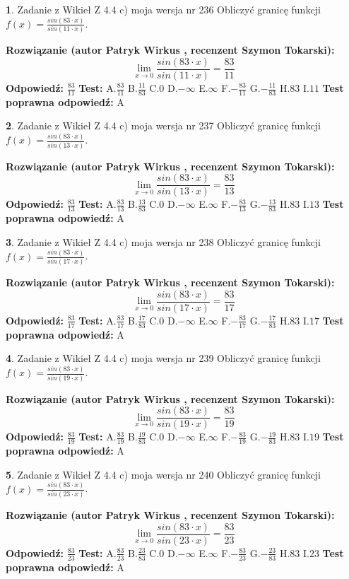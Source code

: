 \documentclass[12pt, a4paper]{article}
\theoremstyle{definition} %
\newtheorem{zad}{}
\newcommand{\zadStart}[1]{\begin{zad}#1\newline}
\newcommand{\zadStop}{\end{zad}}
\newcommand{\rozwStart}[2]{\noindent \textbf{Rozwiązanie (autor #1 , recenzent #2): }\newline}
\newcommand{\rozwStop}{\newline}
\newcommand{\odpStart}{\noindent \textbf{Odpowiedź:}\newline}
\newcommand{\odpStop}{\newline}
\newcommand{\testStart}{\noindent \textbf{Test:}\newline}
\newcommand{\testStop}{\newline}
\newcommand{\kluczStart}{\noindent \textbf{Test poprawna odpowiedź:}\newline}
\newcommand{\kluczStop}{\newline}
\begin{document}
\zadStart{Zadanie z Wikieł Z 4.4 c) moja wersja nr 236}
Obliczyć granicę funkcji $f(x)=\frac{sin(83\cdot x)}{sin(11\cdot x)}$.
\zadStop
\rozwStart{Patryk Wirkus}{Szymon Tokarski}
$$\lim\limits_{x\to 0}\frac{sin(83\cdot x)}{sin(11\cdot x)}=
\frac{83}{11}$$
\rozwStop
\odpStart
$\frac{83}{11}$
\odpStop
\testStart
A.$\frac{83}{11}$
B.$\frac{11}{83}$
C.$0$
D.$-\infty$
E.$\infty$
F.$-\frac{83}{11}$
G.$-\frac{11}{83}$
H.$83$
I.$11$
\testStop
\kluczStart
A
\kluczStop



\zadStart{Zadanie z Wikieł Z 4.4 c) moja wersja nr 237}
Obliczyć granicę funkcji $f(x)=\frac{sin(83\cdot x)}{sin(13\cdot x)}$.
\zadStop
\rozwStart{Patryk Wirkus}{Szymon Tokarski}
$$\lim\limits_{x\to 0}\frac{sin(83\cdot x)}{sin(13\cdot x)}=
\frac{83}{13}$$
\rozwStop
\odpStart
$\frac{83}{13}$
\odpStop
\testStart
A.$\frac{83}{13}$
B.$\frac{13}{83}$
C.$0$
D.$-\infty$
E.$\infty$
F.$-\frac{83}{13}$
G.$-\frac{13}{83}$
H.$83$
I.$13$
\testStop
\kluczStart
A
\kluczStop



\zadStart{Zadanie z Wikieł Z 4.4 c) moja wersja nr 238}
Obliczyć granicę funkcji $f(x)=\frac{sin(83\cdot x)}{sin(17\cdot x)}$.
\zadStop
\rozwStart{Patryk Wirkus}{Szymon Tokarski}
$$\lim\limits_{x\to 0}\frac{sin(83\cdot x)}{sin(17\cdot x)}=
\frac{83}{17}$$
\rozwStop
\odpStart
$\frac{83}{17}$
\odpStop
\testStart
A.$\frac{83}{17}$
B.$\frac{17}{83}$
C.$0$
D.$-\infty$
E.$\infty$
F.$-\frac{83}{17}$
G.$-\frac{17}{83}$
H.$83$
I.$17$
\testStop
\kluczStart
A
\kluczStop



\zadStart{Zadanie z Wikieł Z 4.4 c) moja wersja nr 239}
Obliczyć granicę funkcji $f(x)=\frac{sin(83\cdot x)}{sin(19\cdot x)}$.
\zadStop
\rozwStart{Patryk Wirkus}{Szymon Tokarski}
$$\lim\limits_{x\to 0}\frac{sin(83\cdot x)}{sin(19\cdot x)}=
\frac{83}{19}$$
\rozwStop
\odpStart
$\frac{83}{19}$
\odpStop
\testStart
A.$\frac{83}{19}$
B.$\frac{19}{83}$
C.$0$
D.$-\infty$
E.$\infty$
F.$-\frac{83}{19}$
G.$-\frac{19}{83}$
H.$83$
I.$19$
\testStop
\kluczStart
A
\kluczStop



\zadStart{Zadanie z Wikieł Z 4.4 c) moja wersja nr 240}
Obliczyć granicę funkcji $f(x)=\frac{sin(83\cdot x)}{sin(23\cdot x)}$.
\zadStop
\rozwStart{Patryk Wirkus}{Szymon Tokarski}
$$\lim\limits_{x\to 0}\frac{sin(83\cdot x)}{sin(23\cdot x)}=
\frac{83}{23}$$
\rozwStop
\odpStart
$\frac{83}{23}$
\odpStop
\testStart
A.$\frac{83}{23}$
B.$\frac{23}{83}$
C.$0$
D.$-\infty$
E.$\infty$
F.$-\frac{83}{23}$
G.$-\frac{23}{83}$
H.$83$
I.$23$
\testStop
\kluczStart
A
\kluczStop
\end{document}
